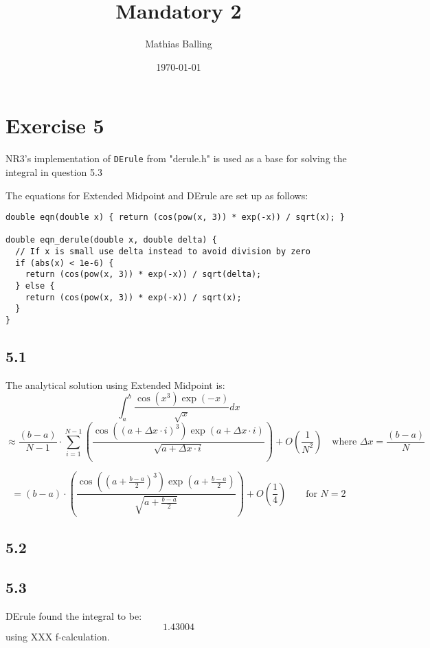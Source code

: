 \documentclass{article}
\title{Mandatory 2}
\author{Mathias Balling}
\date{\today}
\begin{document}
\maketitle

\section*{Exercise 5}
NR3's implementation of \texttt{DErule} from "derule.h" is used as a base for solving the integral in question 5.3

The equations for Extended Midpoint and DErule are set up as follows:
\begin{verbatim}
double eqn(double x) { return (cos(pow(x, 3)) * exp(-x)) / sqrt(x); }

double eqn_derule(double x, double delta) {
  // If x is small use delta instead to avoid division by zero
  if (abs(x) < 1e-6) {
    return (cos(pow(x, 3)) * exp(-x)) / sqrt(delta);
  } else {
    return (cos(pow(x, 3)) * exp(-x)) / sqrt(x);
  }
}
\end{verbatim}

\subsection*{5.1}
The analytical solution using Extended Midpoint is:
$$
\int_{a}^{b}\frac{\cos(x^3)\exp(-x)}{\sqrt{x}}dx
$$
$$
\approx
\frac{(b-a)}{N-1}\cdot\sum_{i=1}^{N-1}\left(
  \frac{
  \cos\left(\left(a+\Delta x\cdot i\right)^3\right)\exp\left(a+\Delta x\cdot i\right)
}{
  \sqrt{a+\Delta x\cdot i}
}
\right)+O\left(\frac{1}{N^2}\right)
\quad{\text{where } \Delta x=\frac{(b-a)}{N}}
$$

$$
=(b-a)\cdot\left(
  \frac{
  \cos\left(\left(a+\frac{b-a}{2}\right)^3\right)\exp\left(a+\frac{b-a}{2}\right)
}{
  \sqrt{a+\frac{b-a}{2}}
}
\right)+O\left(\frac{1}{4}\right)
\qquad{\text{for } N=2}
$$

\subsection*{5.2}
\subsection*{5.3}
DErule found the integral to be:
$$
1.43004
$$
using XXX f-calculation.
\end{document}

